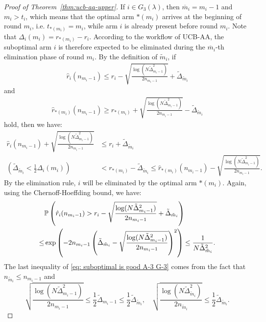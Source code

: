 \documentclass[11pt]{article}
\begin{document}
\begin{proof}[Proof of Theorem~\ref{thm:ucb-aa-upper}]
If $i\in G_3(\lambda)$, then $\overline{m}_i=m_i-1$ and $m_i>t_i$, which means that the optimal arm $*(m_i)$ arrives at the beginning of round $m_i$, i.e. $t_{*(m_i)}=m_i$, while arm $i$ is already present before round $m_i$. Note that $\Delta_i(m_i)=r_{*(m_i)}-r_i$. According to the workflow of UCB-AA, the suboptimal arm $i$ is therefore expected to be eliminated during the $\overline{m}_i$-th elimination phase of round $m_i$. By the definition of $\tilde{m}_i$, if
\begin{align}
    \hat{r}_i(n_{m_i-1}) \leq r_i - \sqrt{\frac{\log(N \tilde{\Delta}_{m_i-1}^2)}{2n_{m_i-1}}}+\tilde{\Delta}_{\tilde{m}_i} \label{eq: suboptimal is bad A-3 G-3}
\end{align}
and  
\begin{align}
    \hat{r}_{*(m_i)}(n_{m_i-1}) \geq r_{*(m_i)} + \sqrt{\frac{\log(N \tilde{\Delta}_{m_i-1}^2)}{2n_{m_i-1}}} -\tilde{\Delta}_{\tilde{m}_i}
    \label{eq: optimal is good A-3 G-3}
\end{align}
hold, then we have:  
\begin{align*}
    \hat{r}_i(n_{m_i-1}) + \sqrt{\frac{\log(N \tilde{\Delta}_{m_i-1}^2)}{2n_{m_i-1}}} &\leq r_i + \tilde{\Delta}_{\tilde{m}_i}\\
   \left(\tilde{\Delta}_{\tilde{m}_i}<\frac{1}{2}\Delta_i(m_i)\right) &< r_{*(m_i)} -\tilde{\Delta}_{\tilde{m}_i} \leq \hat{r}_{*(m_i)}(n_{m_i-1}) - \sqrt{\frac{\log(N \tilde{\Delta}_{m_i-1}^2)}{2n_{m_i-1}}}.
\end{align*}
By the elimination rule, \( i \) will be eliminated by the optimal arm $*(m_i)$. Again, using the Chernoff-Hoeffding bound, we have:
\begin{align}
   & \mathbb{P}\left( \hat{r}_i(n_{m_i-1})>r_i - \sqrt{\frac{\log(N \tilde{\Delta}_{m_i-1}^2)}{2n_{m_i-1}}}+\tilde{\Delta}_{\tilde{m}_i} \right) \notag\\   
   \leq &\exp\left(-2n_{m_i-1}\left(\tilde{\Delta}_{\tilde{m}_i} - \sqrt{\frac{\log(N \tilde{\Delta}_{m_i-1}^2)}{2n_{m_i-1}}}\right)^2\right)\leq \frac{1}{N\tilde{\Delta}_{\tilde{m}_i}^2}.
    \label{eq: suboptimal is good A-3 G-3}
\end{align}
The last inequality of \eqref{eq: suboptimal is good A-3 G-3} comes from the fact that $n_{\tilde{m}_i}\leq n_{m_i-1}$ and
\[\sqrt{\frac{\log(N \tilde{\Delta}_{m_i-1}^2)}{2n_{m_i-1}}}\leq \frac{1}{2}\tilde{\Delta}_{m_i-1}\leq \frac{1}{2}\tilde{\Delta}_{\tilde{m}_i},\quad \sqrt{\frac{\log(N \tilde{\Delta}_{\tilde{m}_i}^2)}{2n_{\tilde{m}_i}}}\leq \frac{1}{2}\tilde{\Delta}_{\tilde{m}_i}.\]


\end{proof}
\end{document}
